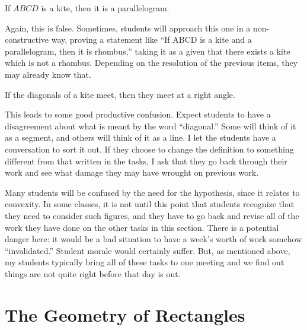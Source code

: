 \begin{conjecture}\label{conj:kite-is-parallelogram}
If $ABCD$ is a kite, then it is a parallelogram.
\end{conjecture}

\begin{annotation}
{
\color{blue}
Again, this is false. Sometimes, students will approach this one in a non-constructive way, proving a statement like ``If ABCD is a kite and a parallelogram, then it is rhombus,'' taking it as a given that there exists a kite which is not a rhombus. Depending on the resolution of the 
previous items, they may already know that.

}
\end{annotation}

\begin{conjecture}\label{conj:kite-diagonals-perpendicular}
If the diagonals of a kite meet, then they meet at a right angle.
\end{conjecture}

\begin{annotation}
{
\color{blue}
This leads to some good productive confusion. Expect students to have a disagreement about what is meant by the word ``diagonal.'' Some will think of it as a segment, and others will think of it as a line. I let the students have a conversation to sort it out. If they choose to change the definition to something different from that written in the tasks, I ask that they go back through their work and see what damage they may have wrought on previous work.

Many students will be confused by the need for the hypothesis, since it relates to convexity. In some classes, it is not until this point that students recognize that they need to consider such figures, and they have to go back and revise all of the work they have done on the other tasks in this section. 
There is a potential danger here: it would be a bad situation to have a week's worth of work somehow ``invalidated.'' Student morale would certainly suffer. But, as mentioned above, my students typically bring all of these tasks to one meeting and we find out things are not quite right before that day is out. 
}
\end{annotation}

\chapter{The Geometry of Rectangles}\label{section:rectangles}

